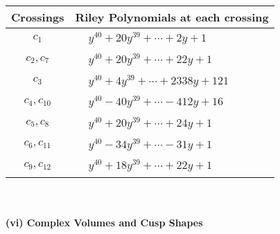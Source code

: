 \documentclass[1p]{elsarticle_modified}
\theoremstyle{definition}
\begin{document}
\begin{tabular}{m{50pt}|m{274pt}}
Crossings & \hspace{64pt}Riley Polynomials at each crossing \\
\hline $$\begin{aligned}c_{1}\end{aligned}$$&$\begin{aligned}
&y^{40}+20 y^{39}+\cdots+2 y+1
\end{aligned}$\\
\hline $$\begin{aligned}c_{2},c_{7}\end{aligned}$$&$\begin{aligned}
&y^{40}+20 y^{39}+\cdots+22 y+1
\end{aligned}$\\
\hline $$\begin{aligned}c_{3}\end{aligned}$$&$\begin{aligned}
&y^{40}+4 y^{39}+\cdots+2338 y+121
\end{aligned}$\\
\hline $$\begin{aligned}c_{4},c_{10}\end{aligned}$$&$\begin{aligned}
&y^{40}-40 y^{39}+\cdots-412 y+16
\end{aligned}$\\
\hline $$\begin{aligned}c_{5},c_{8}\end{aligned}$$&$\begin{aligned}
&y^{40}+20 y^{39}+\cdots+24 y+1
\end{aligned}$\\
\hline $$\begin{aligned}c_{6},c_{11}\end{aligned}$$&$\begin{aligned}
&y^{40}-34 y^{39}+\cdots-31 y+1
\end{aligned}$\\
\hline $$\begin{aligned}c_{9},c_{12}\end{aligned}$$&$\begin{aligned}
&y^{40}+18 y^{39}+\cdots+22 y+1
\end{aligned}$\\
\hline
\end{tabular}\\~\\
\newpage\flushleft \textbf{(vi) Complex Volumes and Cusp Shapes}
\end{document}
